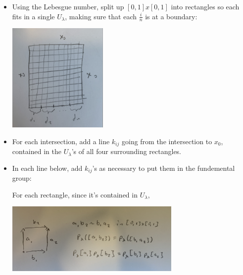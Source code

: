 \documentclass[8pt]{beamer}
\begin{document}
\begin{frame}
\begin{columns}
\begin{column}[T]{0.5\textwidth}
\begin{itemize}
        \end{itemize}
      \end{column}
      \begin{column}[T]{0.5\textwidth}
        \begin{itemize}
          \item Using the Lebesgue number, split up $[0,1]x[0,1]$ into rectangles
            so each fits in a single $U_\lambda$, making sure that each $\frac{i}{n}$ is at a boundary:
            \begin{center}
              \includegraphics[width=0.4\textwidth]{img/proof-pt2-overview.JPG}
            \end{center}
          \item For each intersection, add a line $k_{ij}$ going from the intersection to $x_0$, contained in the $U_\lambda$'s of all four surrounding rectangles.
          \item In each line below, add $k_{ij}$'s as necessary to put them in the fundemental group:

            For each rectangle, since it's contained in $U_\lambda$,
            \begin{center}
              \includegraphics[width=0.7\textwidth]{img/proof-pt2-each-rectangle.JPG}
            \end{center}

          \end{itemize}
      \end{column}
    \end{columns}
  \end{frame}
\end{document}
